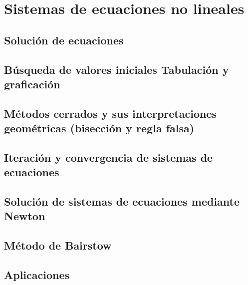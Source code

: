 \chapter{Sistemas de ecuaciones no lineales}

\section{Solución de ecuaciones}
\section{Búsqueda de valores iniciales Tabulación y graficación}
\section{Métodos cerrados y sus interpretaciones geométricas (bisección y regla falsa)}
\section{Iteración y convergencia de sistemas de ecuaciones}
\section{Solución de sistemas de ecuaciones mediante Newton}
\section{Método de Bairstow}
\section{Aplicaciones}
